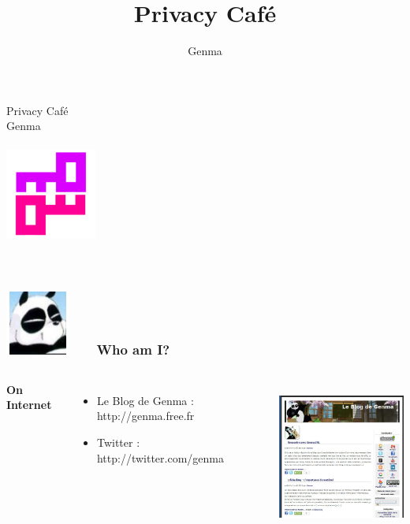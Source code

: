 \documentclass{beamer}
\title[Privacy Café]{Privacy Café}
\author{Genma}
\begin{document}
\begin{frame}
	\begin{center}
	 	\huge{Privacy Café}
	 	\\
		\Large{Genma}
	 	\\~\\
		\includegraphics[width=3cm,height=3cm]{./CryptopartyGenericLogo.jpg} 
		\\~\\
		\\
		{\tiny\CcNote{\CcLongnameByNcSa}}
		\vspace*{-2.5ex}
	\end{center}
\end{frame}



\begin{frame}
\frametitle{\includegraphics[scale=0.4]{./Genma.jpg} \ \ \  Who am I? }
\begin{columns}[c] 

\textbf{On Internet}
\begin{itemize}
\item Le Blog de Genma : http://genma.free.fr
\item Twitter : http://twitter.com/genma
\end{itemize}

\includegraphics[width=5cm,height=5cm]{./blog.jpg} 

\end{columns}
\end{frame}
\end{document}
